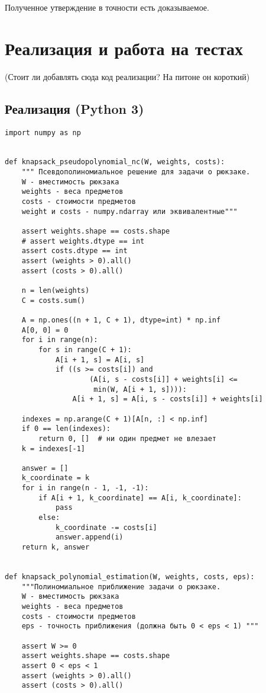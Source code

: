\documentclass{article}
\begin{document}
	Полученное утверждение в точности есть доказываемое.
	
	
	
	
	
\section{Реализация и работа на тестах}
	(Стоит ли добавлять сюда код реализации? На питоне он короткий)
	\subsection{Реализация (Python 3)}
	
\begin{verbatim}
import numpy as np


def knapsack_pseudopolynomial_nc(W, weights, costs):
    """ Псевдополиномиальное решение для задачи о рюкзаке.
    W - вместимость рюкзака
    weights - веса предметов
    costs - стоимости предметов
    weight и costs - numpy.ndarray или эквивалентные"""

    assert weights.shape == costs.shape
    # assert weights.dtype == int
    assert costs.dtype == int
    assert (weights > 0).all()
    assert (costs > 0).all()

    n = len(weights)
    C = costs.sum()

    A = np.ones((n + 1, C + 1), dtype=int) * np.inf
    A[0, 0] = 0
    for i in range(n):
        for s in range(C + 1):
            A[i + 1, s] = A[i, s]
            if ((s >= costs[i]) and
                    (A[i, s - costs[i]] + weights[i] <=
                     min(W, A[i + 1, s]))):
                A[i + 1, s] = A[i, s - costs[i]] + weights[i]

    indexes = np.arange(C + 1)[A[n, :] < np.inf]
    if 0 == len(indexes):
        return 0, []  # ни один предмет не влезает
    k = indexes[-1]

    answer = []
    k_coordinate = k
    for i in range(n - 1, -1, -1):
        if A[i + 1, k_coordinate] == A[i, k_coordinate]:
            pass
        else:
            k_coordinate -= costs[i]
            answer.append(i)
    return k, answer


def knapsack_polynomial_estimation(W, weights, costs, eps):
    """Полиномиальное приближение задачи о рюкзаке.
    W - вместимость рюкзака
    weights - веса предметов
    costs - стоимости предметов
    eps - точность приближения (должна быть 0 < eps < 1) """

    assert W >= 0
    assert weights.shape == costs.shape
    assert 0 < eps < 1
    assert (weights > 0).all()
    assert (costs > 0).all()


\end{verbatim}
\end{document}
